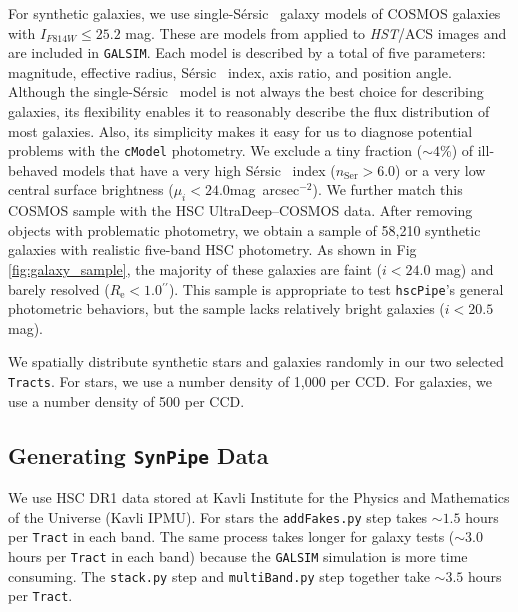 \documentclass[useamsfonts]{pasj01}
\def\asec{$^{\prime\prime}$}
\def\sb{mag~arcsec$^{-2}$}
\def\ser{{S\'{e}rsic\ }}
\def\hscpipe{\texttt{hscPipe}}
\def\synpipe{\texttt{SynPipe}}
\def\cmodel{\texttt{cModel}}
\def\tract{\texttt{Tract}}
\def\tracts{\texttt{Tracts}}
\def\galsim{\texttt{G}{\scriptsize \texttt{AL}}\texttt{S}{\scriptsize \texttt{IM}}}
\begin{document}
    For synthetic galaxies, we use single-\ser{} galaxy models of COSMOS galaxies with 
    $I_{F814W} \leq 25.2$ mag. 
    These are models from \citet{Lackner2012} applied to \textit{HST}/ACS images and 
    are included in \galsim{}. 
    Each model is described by a total of five parameters: magnitude, effective radius,
    \ser{} index, axis ratio, and position angle.
    Although the single-\ser{} model is not always the best choice for describing 
    galaxies, its flexibility enables it to reasonably describe the flux distribution 
    of most galaxies.
    Also, its simplicity makes it easy for us to diagnose potential problems with the 
    \cmodel{} photometry.
    We exclude a tiny fraction (${\sim}4$\%) of ill-behaved models that have a very 
    high \ser{} index ($n_{\mathrm{Ser}} > 6.0$) or a very low central surface 
    brightness ($\mu_{i} < 24.0$\sb).
    We further match this COSMOS sample with the HSC UltraDeep--COSMOS data.
    After removing objects with problematic photometry, we obtain a sample of
    58,210 synthetic galaxies with realistic five-band HSC photometry.
    As shown in Fig \ref{fig:galaxy_sample}, the majority of these galaxies are
    faint ($i<24.0$ mag) and barely resolved ($R_{\mathrm{e}}< 1.0$\asec).
    This sample is appropriate to test \hscpipe{}'s general photometric behaviors, 
    but the sample lacks relatively bright galaxies ($i<20.5$ mag).

    We spatially distribute synthetic stars and galaxies randomly in our two selected 
    \tracts{}. 
    For stars, we use a number density of 1,000 per CCD. 
    For galaxies, we use a number density of 500 per CCD.


\subsection{Generating \synpipe{} Data}
    \label{ssec:running}

    We use HSC DR1 data stored at Kavli Institute for the Physics and Mathematics of 
    the Universe (Kavli IPMU). 
    For stars the \texttt{addFakes.py} step takes ${\sim}1.5$ hours per \tract{} in 
    each band. 
    The same process takes longer for galaxy tests (${\sim}3.0$ hours per
    \tract{} in each band) because the \galsim{} simulation is more time consuming.
    The \texttt{stack.py} step and \texttt{multiBand.py} step together take 
    ${\sim}3.5$ hours per \tract{}.
\end{document}
